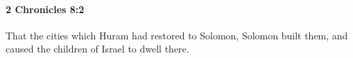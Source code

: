 
		\paragraph{2 Chronicles 8:2} %
			\label{2CHRONICLES-8-2}

			That the cities which Huram had restored to Solomon, Solomon built them, and caused the children of Israel to dwell there.



